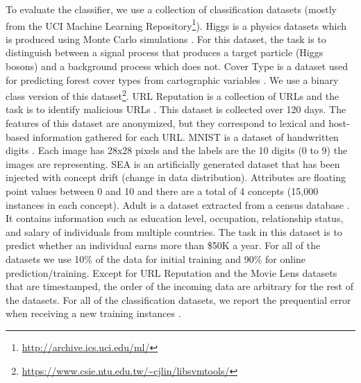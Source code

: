 \documentclass{vldb}
\begin{document}
To evaluate the classifier, we use a collection of classification datasets (mostly from the UCI Machine Learning Repository\footnote{\url{http://archive.ics.uci.edu/ml/}}).
Higgs is a physics datasets which is produced using Monte Carlo simulations \cite{baldi2014searching}.
For this dataset, the task is to distinguish between a signal process that produces a target particle (Higgs bosons) and a background process which does not.
Cover Type is a dataset used for predicting forest cover types from cartographic variables \cite{collobert2002parallel}.
We use a binary class version of this dataset\footnote{\url{https://www.csie.ntu.edu.tw/~cjlin/libsvmtools/}}.
URL Reputation is a collection of URLs and the task is to identify malicious URLs \cite{ma2009identifying}. 
This dataset is collected over 120 days.
The features of this dataset are anonymized, but they correspond to lexical and host-based information gathered for each URL.
MNIST is a dataset of handwritten digits \cite{lecun-mnist}.
Each image has 28x28 pixels and the labels are the 10 digits (0 to 9) the images are representing.
SEA is an artificially generated dataset that has been injected with concept drift (change in data distribution)\cite{street2001streaming}.
Attributes are floating point values between 0 and 10 and there are a total of 4 concepts (15,000 instances in each concept).
Adult is a dataset extracted from a census database \cite{platt199912}.
It contains information such as education level, occupation, relationship status, and salary of individuals from multiple countries.
The task in this dataset is to predict whether an individual earns more than \$50K a year. 
For all of the datasets we use 10\% of the data for initial training and 90\% for online prediction/training.
Except for URL Reputation and the Movie Lens datasets that are timestamped, the order of the incoming data are arbitrary for the rest of the datasets.
For all of the classification datasets, we report the prequential error when receiving a new training instances \cite{gama2009issues} .
\end{document}
